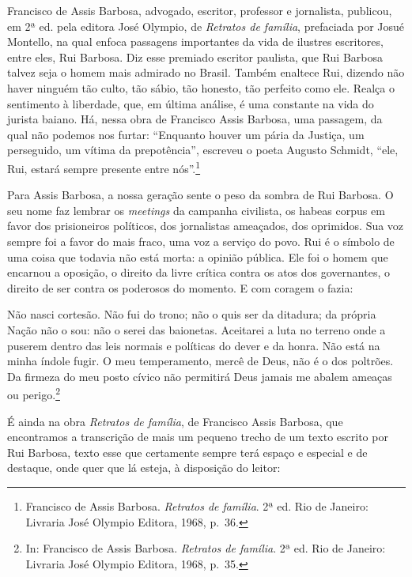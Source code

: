 Francisco de Assis Barbosa, advogado, escritor, professor e jornalista,
publicou, em 2ª ed. pela editora José Olympio, de \textit{Retratos de família},
prefaciada por Josué Montello, na qual enfoca passagens importantes da
vida de ilustres escritores, entre eles, Rui Barbosa. Diz esse premiado
escritor paulista, que Rui Barbosa talvez seja o homem mais admirado no
Brasil. Também enaltece Rui, dizendo não haver ninguém tão culto, tão
sábio, tão honesto, tão perfeito como ele. Realça o sentimento à
liberdade, que, em última análise, é uma constante na vida do jurista
baiano. Há, nessa obra de Francisco Assis Barbosa, uma passagem, da
qual não podemos nos furtar: “Enquanto houver um pária da Justiça, um
perseguido, um vítima da prepotência'', escreveu o poeta Augusto Schmidt,
``ele, Rui, estará sempre presente entre nós''.\footnote{ Francisco de 
Assis Barbosa. \textit{Retratos de família}. 2ª ed. Rio de Janeiro: 
Livraria José Olympio Editora, 1968, p.~36.}

Para Assis Barbosa, a nossa geração sente o peso da sombra de Rui
Barbosa. O seu nome faz lembrar os \textit{meetings} da campanha civilista, os
habeas corpus em favor dos prisioneiros políticos, dos jornalistas
ameaçados, dos oprimidos. Sua voz sempre foi a favor do mais
fraco, uma voz a serviço do povo. Rui é o símbolo de uma coisa que
todavia não está morta: a opinião pública. Ele foi o homem que encarnou
a oposição, o direito da livre crítica contra os atos dos governantes,
o direito de ser contra os poderosos do momento. E com coragem o fazia:

\begin{hedraquote}
Não nasci cortesão. Não fui do trono; não o quis ser da ditadura; 
da própria Nação não o sou: não o
serei das baionetas. Aceitarei a luta no terreno onde a puserem dentro
das leis normais e políticas do dever e da honra. Não está na minha
índole fugir. O meu temperamento, mercê de Deus, não é o dos poltrões.
Da firmeza do meu posto cívico não permitirá Deus jamais me abalem
ameaças ou perigo.\footnote{ In: Francisco de Assis Barbosa. 
\textit{Retratos de família}. 2ª ed. Rio de Janeiro: Livraria José Olympio 
Editora, 1968, p.~35.}
\end{hedraquote}
 
É ainda na obra \textit{Retratos de família}, de Francisco Assis Barbosa, que
encontramos a transcrição de mais um pequeno trecho de um texto escrito
por Rui Barbosa, texto esse que certamente sempre terá espaço e
especial e de destaque, onde quer que lá esteja, à disposição do leitor: 

